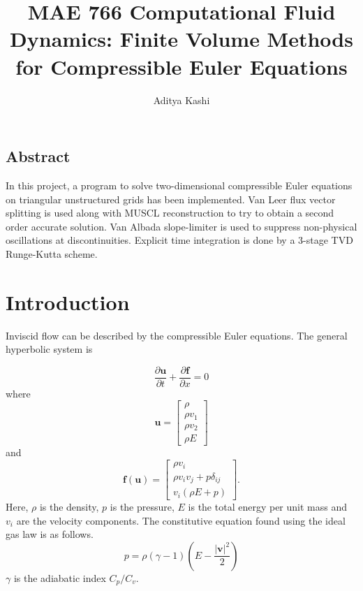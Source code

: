 \documentclass[letterpaper,twoside,12pt]{article}
\title{MAE 766 Computational Fluid Dynamics: Finite Volume Methods for Compressible Euler Equations}
\author{Aditya Kashi}
\begin{document}
\maketitle
\subsection*{Abstract}
In this project, a program to solve two-dimensional compressible Euler equations on triangular unstructured grids has been implemented. Van Leer flux vector splitting is used along with MUSCL reconstruction to try to obtain a second order accurate solution. Van Albada slope-limiter is used to suppress non-physical oscillations at discontinuities. Explicit time integration is done by a 3-stage TVD Runge-Kutta scheme.

\section{Introduction}

Inviscid flow can be described by the compressible Euler equations. The general hyperbolic system is

\begin{equation}
	\frac{\partial \mathbf{u}}{\partial t} + \frac{\partial \mathbf{f}}{\partial x} = 0
\end{equation}
where 
\begin{equation}
	\mathbf{u} = 
	\begin{bmatrix}
		\rho \\ 
		\rho v_1 \\
		\rho v_2 \\
		\rho E
	\end{bmatrix}
\end{equation}
and
\begin{equation}
\mathbf{f}(\mathbf{u}) = 
\begin{bmatrix}
	\rho v_i \\
	\rho v_i v_j + p \delta_{ij} \\
	v_i(\rho E + p)
\end{bmatrix}.
\end{equation}
Here, $\rho$ is the density, $p$ is the pressure, $E$ is the total energy per unit mass and $v_i$ are the velocity components.
The constitutive equation found using the ideal gas law is as follows.
\begin{equation}
	p = \rho (\gamma-1)(E - \frac{|\mathbf{v}|^2}{2})
\end{equation}
$\gamma$ is the adiabatic index $C_p/C_v$.
\end{document}
